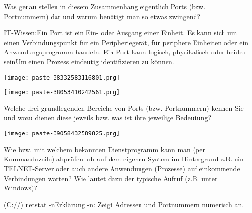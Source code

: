 \documentclass{article}
\begin{document}
\begin{tcolorbox}[colback=white!10!white,colframe=lightgray!75!black,
  savelowerto=\jobname_ex.tex,breakable,enhanced,lines before break=40]

\justifying
Was genau stellen in diesem Zusammenhang eigentlich Ports (bzw. Portnummern) dar und warum benötigt man so etwas zwingend?

\tcblower

\justifying
IT-Wissen:Ein Port ist ein Ein- oder Ausgang einer Einheit. Es kann sich um einen Verbindungspunkt für ein Peripheriegerät, für periphere Einheiten oder ein Anwendungsprogramm handeln. Ein Port kann logisch, physikalisch oder beides seinUm einen Prozess eindeutig identifizieren zu können.\begin{center}
\texttt{[image: paste-38332583116801.png]}
\end{center}
\begin{center}
\texttt{[image: paste-38053410242561.png]}
\end{center}

\end{tcolorbox}
\begin{tcolorbox}[colback=white!10!white,colframe=lightgray!75!black,
  savelowerto=\jobname_ex.tex,breakable,enhanced,lines before break=40]

\justifying
Welche drei grundlegenden Bereiche von Ports (bzw. Portnummern) kennen Sie und wozu dienen diese jeweils bzw. was ist ihre jeweilige Bedeutung?

\tcblower

\justifying
\begin{center}
\texttt{[image: paste-39058432589825.png]}
\end{center}

\end{tcolorbox}
\begin{tcolorbox}[colback=white!10!white,colframe=lightgray!75!black,
  savelowerto=\jobname_ex.tex,breakable,enhanced,lines before break=40]

\justifying
Wie bzw. mit welchem bekannten Dienstprogramm kann man (per Kommandozeile) abprüfen, ob auf dem eigenen System im Hintergrund z.B. ein TELNET-Server oder auch andere Anwendungen (Prozesse) auf einkommende Verbindungen warten? Wie lautet dazu der typische Aufruf (z.B. unter Windows)?

\tcblower

\justifying
(C://) netstat -nErklärung -n: Zeigt Adressen und Portnummern numerisch an.
\end{tcolorbox}
\end{document}
